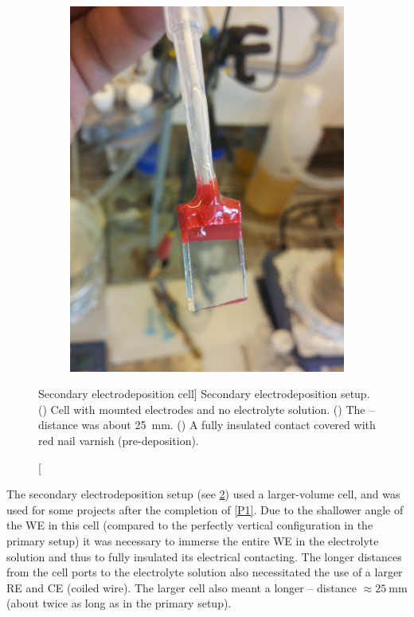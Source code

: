 \documentclass[draft,webedition,openright,titles,swedish,english]{LuaUUThesis}\usepackage[]{graphicx}\usepackage[]{xcolor}
\begin{document}
\begin{figure}[tbp]
\begin{subfigure}[b]{0.25\linewidth}
   \includegraphics[width=\textwidth]{synthesis/electrodeposition/0311110433-cropped.jpg}
   \caption{}
   \label{fig:0301-ED-electrode-insulated}
\end{subfigure}%
\caption%
[Secondary electrodeposition cell]{%
   Secondary electrodeposition setup.
   ()
   Cell with mounted electrodes and no electrolyte solution.
   ()
   The -- distance was about \qty{25}{\mm}.
   ()
   A fully insulated contact covered with red nail varnish (pre-deposition).
}
\label{fig:0301-ED-cell-autolab}
\end{figure}

The secondary electrodeposition setup (see \cref{fig:0301-ED-cell-autolab}) used
a larger-volume cell, and was used for some projects after the completion of \cref{P1}.
Due to the shallower angle of the \gls{WE} in this cell (compared to the perfectly
vertical configuration in the primary setup) it was necessary to immerse the
entire \gls{WE} in the electrolyte solution and thus to fully insulated its electrical
contacting.
The longer distances from the cell ports to the electrolyte solution also
necessitated the use of a larger \gls{RE} and \gls{CE} (coiled  wire).
The larger cell also meant a longer -- distance
$\approx\qty{25}{\mm}$ (about twice as long as in the primary setup).
\end{document}
